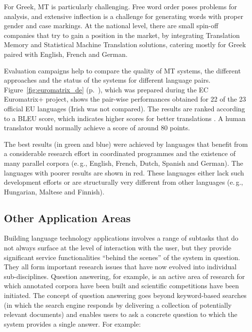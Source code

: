 \begin{multicols}{2}
For Greek, MT is particularly challenging. Free word order poses problems for analysis, and extensive inflection is a challenge for generating words with proper gender and case markings. At the national level, there are small spin-off companies that try to gain a position in the market, by integrating Translation Memory and Statistical Machine Translation solutions, catering mostly for Greek paired with English, French and German.

Evaluation campaigns help to compare the quality of MT systems, the different approaches and the status of the systems for different language pairs. Figure~\ref{fig:euromatrix_de} (p.~\pageref{fig:euromatrix_de}), which was prepared during the EC Euromatrix+ project, shows the pair-wise performances obtained for 22 of the 23 official EU languages (Irish was not compared). The results are ranked according to a BLEU score, which indicates higher scores for better translations \cite{bleu1}. A human translator would normally achieve a score of around 80 points.

The best results (in green and blue) were achieved by languages that benefit from a considerable research effort in coordinated programmes and the existence of many parallel corpora (e.\,g., English, French, Dutch, Spanish and German). The languages with poorer results are shown in red. These languages either lack such development efforts or are structurally very different from other languages (e.\,g., Hungarian, Maltese and Finnish).

\subsection{Other Application Areas}

Building language technology applications involves a range of subtasks that do not always surface at the level of interaction with the user, but they provide significant service functionalities “behind the scenes” of the system in question. They all form important research issues that have now evolved into individual sub-disciplines. Question answering, for example, is an active area of research for which annotated corpora have been built and scientific competitions have been initiated. The concept of question answering goes beyond keyword-based searches (in which the search engine responds by delivering a collection of potentially relevant documents) and enables users to ask a concrete question to which the system provides a single answer. For example:


\end{multicols}
